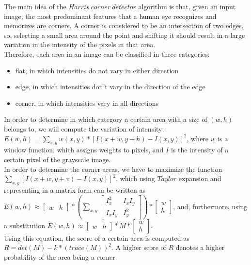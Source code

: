 \documentclass[conference]{IEEEtran}
\begin{document}
The main idea of the $Harris\ corner\ detector$ algorithm is that, given an input image, the most predominant features that a human eye recognizes and memorizes are corners. A corner is considered to be an intersection of two edges, so, selecting a small area around the point and shifting it should result in a large variation in the intensity of the pixels in that area. \\
Therefore, each area in an image can be classified in three categories:
\begin{itemize}
	\item flat, in which intensities do not vary in either direction
	\item edge, in which intensities don't vary in the direction of the edge
	\item corner, in which intensities vary in all directions
\end{itemize}

In order to determine in which category a certain area with a size of $(w, h)$ belongs to, we will compute the variation of intensity: $E(w, h) = \sum_{x, y} w(x, y) * [I(x + w, y + h) - I(x, y)]^2$, where $w$ is a window function, which assigns weights to pixels, and $I$ is the intensity of a certain pixel of the grayscale image.\\
In order to determine the corner areas, we have to maximize the function $\sum_{x, y}[I(x + w, y + v) - I(x, y)]^2$, which using $Taylor$ expansion and representing in a matrix form can be written as
$E(w, h) \approx
\begin{bmatrix}
w & h
\end{bmatrix} * 
\left(\sum_{x, y}
\begin{bmatrix}
I_x^2 & I_xI_y\\
I_xI_y & I_y^2
\end{bmatrix}
\right) *
\begin{bmatrix}
w \\
h
\end{bmatrix}$, and, furthermore, using a substitution
$E(w, h) \approx
\begin{bmatrix}
w & h
\end{bmatrix} * 
M *
\begin{bmatrix}
w \\
h
\end{bmatrix}$.\\
Using this equation, the score of a certain area is computed as $R = det(M) - k * (trace(M))^2$. A higher score of $R$ denotes a higher probability of the area being a corner.
\end{document}
